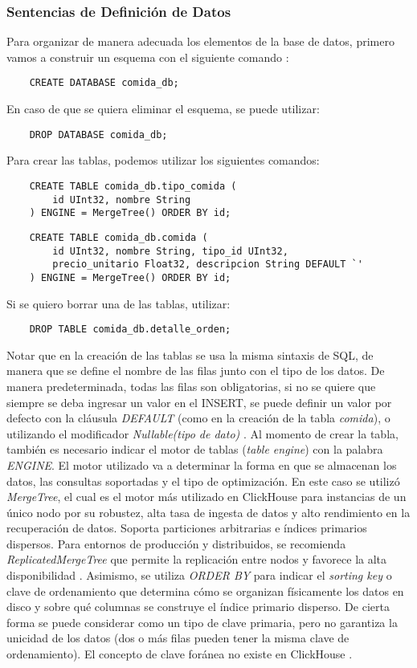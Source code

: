 \subsubsection{Sentencias de Definición de Datos}

Para organizar de manera adecuada los elementos de la base de datos, primero vamos a construir un esquema con el siguiente comando \parencite{clickhouse_sql_reference}:  
\begin{verbatim}
    CREATE DATABASE comida_db;
\end{verbatim}
En caso de que se quiera eliminar el esquema, se puede utilizar: 
\begin{verbatim}
    DROP DATABASE comida_db;
\end{verbatim}
Para crear las tablas, podemos utilizar los siguientes comandos: 
\begin{verbatim}
    CREATE TABLE comida_db.tipo_comida (
        id UInt32, nombre String
    ) ENGINE = MergeTree() ORDER BY id;
\end{verbatim}

\begin{verbatim}
    CREATE TABLE comida_db.comida (
        id UInt32, nombre String, tipo_id UInt32,
        precio_unitario Float32, descripcion String DEFAULT `'
    ) ENGINE = MergeTree() ORDER BY id;
\end{verbatim}
Si se quiero borrar una de las tablas, utilizar:
\begin{verbatim}
    DROP TABLE comida_db.detalle_orden;
\end{verbatim}
Notar que en la creación de las tablas se usa la misma sintaxis de SQL, de manera que se define el nombre de las filas junto con el tipo de los datos. De manera predeterminada, todas las filas son obligatorias, si no se quiere que siempre se deba ingresar un valor en el INSERT, se puede definir un valor por defecto con la cláusula \emph{DEFAULT} (como en la creación de la tabla \textit{comida}), o utilizando el modificador \emph{Nullable(tipo de dato)} \parencite{clickhouse_sql_reference}. Al momento de crear la tabla, también es necesario indicar el motor de tablas (\emph{table engine}) con la palabra \emph{ENGINE}. El motor utilizado va a determinar la forma en que se almacenan los datos, las consultas soportadas y el tipo de optimización. En este caso se utilizó \emph{MergeTree}, el cual es el motor más utilizado en ClickHouse para instancias de un único nodo por su robustez, alta tasa de ingesta de datos y alto rendimiento en la recuperación de datos. Soporta particiones arbitrarias e índices primarios dispersos. Para entornos de producción y distribuidos, se recomienda \emph{ReplicatedMergeTree} que permite la replicación entre nodos y favorece la alta disponibilidad \parencite{clickhouse_mergetree}. Asimismo, se utiliza \emph{ORDER BY} para indicar el \emph{sorting key} o clave de ordenamiento que determina cómo se organizan físicamente los datos en disco y sobre qué columnas se construye el índice primario disperso. De cierta forma se puede considerar como un tipo de clave primaria, pero no garantiza la unicidad de los datos (dos o más filas pueden tener la misma clave de ordenamiento). El concepto de clave foránea no existe en ClickHouse \parencite{clickhouse_sql_reference}. 

